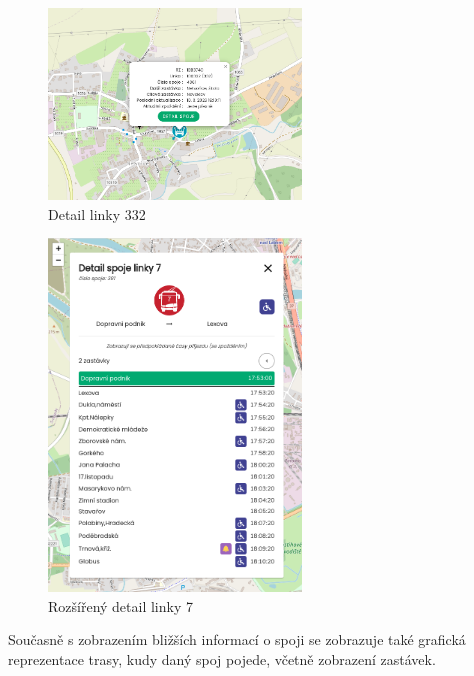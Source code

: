 \begin{figure}[H]
    \centering
    \includegraphics[width=0.6\textwidth]{images/small_detail.png}
    \caption{Detail linky 332}
    \label{detail332}
\end{figure}

\begin{figure}[H]
    \centering
    \includegraphics[width=0.6\textwidth]{images/global_pce_con_detail_7.png}
    \caption{Rozšířený detail linky 7}
    \label{detail7}
\end{figure}

Současně s zobrazením bližších informací o spoji se zobrazuje také grafická reprezentace trasy, kudy daný spoj pojede, včetně zobrazení zastávek.

